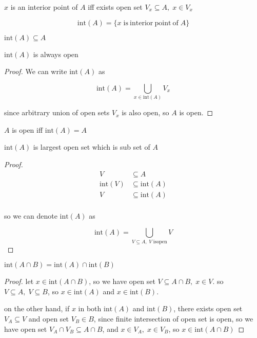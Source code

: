 \begin{definition}
    $x$ is an interior point of $A$ iff exists open set $V_x \subseteq A,\; x \in V_x$ 


    \[
        \mathrm{int}(A) = \{ x \;\mathrm{ is \:interior \:point \: of}\; A \}
    \]
\end{definition}


\begin{corollary}
    $\mathrm{int}(A) \subseteq A$
\end{corollary}


\begin{lem}
    $\mathrm{int}(A)$ is always open 
\end{lem}

\begin{proof}
    We can write $\mathrm{int}(A)$ as

    \[
        \mathrm{int}(A) = \bigcup_{x \in \mathrm{int}(A)}V_x
    \]

    since arbitrary union of open sets $V_x$ is also open, so $A$ is open.
\end{proof}

\begin{corollary}
    $A$ is open iff $\mathrm{int}(A) = A$
\end{corollary}

\begin{corollary}
   $\mathrm{int}(A)$ is largest open set which is sub set of $A$
\end{corollary}

\begin{proof}
    \begin{align*}
        V &\subseteq A \\
        \mathrm{int}(V) &\subseteq \mathrm{int}(A) \\
        V &\subseteq \mathrm{int}(A) \\
    \end{align*}

    so we can denote $\mathrm{int}(A)$ as

    \[
        \mathrm{int}(A) = \bigcup_{V \subseteq A,\; V\;\mathrm{is open}}V
    \]
\end{proof}


\begin{thm}
$\mathrm{int}(A \cap B) = \mathrm{int}(A) \cap \mathrm{int}(B)$
\end{thm}

\begin{proof}
    let $x \in \mathrm{int}(A \cap B)$, so we have open set $V \subseteq A \cap B,\; x \in V$. so 
    $V \subseteq A,\; V \subseteq B$, so $x \in \mathrm{int}(A)$ and $x \in \mathrm{int}(B)$. 

    on the other hand, if $x$ in both $\mathrm{int}(A)$ and $\mathrm{int}(B)$, there exists open set $V_A \subseteq V$
    and open set $V_B \in B$, since finite intersection of open set is open, so we have open set $V_A \cap V_B \subseteq A \cap B$,
    and $x \in V_A,\; x \in V_B$, so $x \in \mathrm{int}(A \cap B)$
\end{proof}



